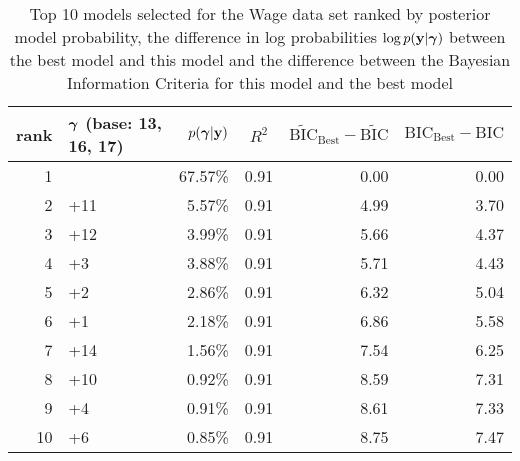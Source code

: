 \begin{table}[h]
	
	\begin{center}
		\begin{tabular}{r|l|r|c|r|r}
			rank & ${\boldsymbol \gamma}$ (base: 13, 16, 17) & $p({\boldsymbol \gamma}|{\bf y})$ & $R^2$ & $\widetilde{\text{BIC}}_\text{Best} - \widetilde{\text{BIC}}$ & $\text{BIC}_\text{Best} - \text{BIC}$ \\
			\hline
			1 &  &  67.57\%&  0.91&  0.00&  0.00\\
			2 &  +11&  5.57\%&  0.91&  4.99&  3.70\\
			3 &  +12&  3.99\%&  0.91&  5.66&  4.37\\
			4 &  +3&  3.88\%&  0.91&  5.71&  4.43\\
			5 &  +2&  2.86\%&  0.91&  6.32&  5.04\\
			6 &  +1&  2.18\%&  0.91&  6.86&  5.58\\
			7 &  +14&  1.56\%&  0.91&  7.54&  6.25\\
			8 &  +10&  0.92\%&  0.91&  8.59&  7.31\\
			9 &  +4&  0.91\%&  0.91&  8.61&  7.33\\
			10 &  +6&  0.85\%&  0.91&  8.75&  7.47\\
		\end{tabular}
	\end{center}
	\label{tab:numerical_results_wage}
	\caption{Top 10 models selected for the Wage data set ranked by posterior model probability, the difference
		in log probabilities $\log p({\bf y}|{\boldsymbol \gamma})$ between the best model and this model and the difference
		between the Bayesian Information Criteria for this model and the best model}
\end{table}

